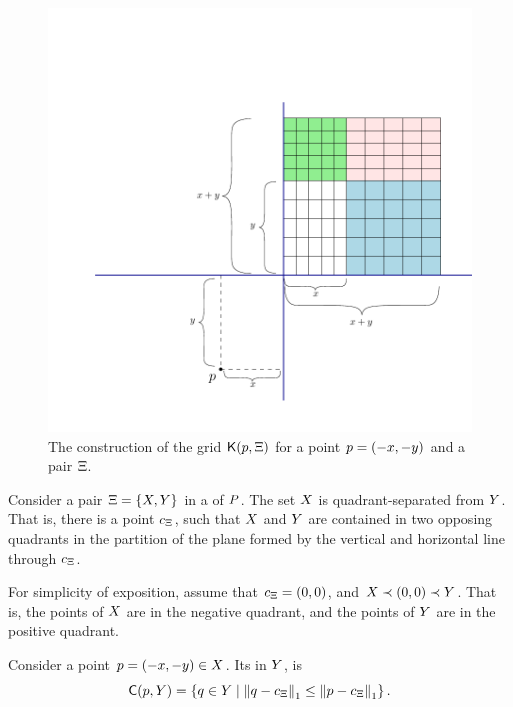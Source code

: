 \documentclass[12pt]{article}%
\begin{document}
\begin{figure}[t]
    \centering%
    \includegraphics{figs/grid_construction}%
    \caption{The construction of the grid $\mathsf{K}(p,\Xi)$ for a
       point $p=(-x,-y)$ and a pair $\Xi$.
   }
\end{figure}

Consider a pair $\Xi = \{X, Y \}$ in a \QSPD of $P$. The set
$X$ is quadrant-separated from $Y$. That is, there is a point
$c_\Xi$, such that $X$ and $Y$ are contained in two
opposing quadrants in the partition of the plane formed by the
vertical and horizontal line through $c_\Xi$.

For simplicity of exposition, assume that $c_\Xi = (0,0)$, and
$X \prec (0,0 ) \prec Y$. That is, the points of $X$ are in
the negative quadrant, and the points of $Y$ are in the positive
quadrant.

Consider a point $p = (-x,-y) \in X$. Its  in $Y$,
is
\begin{equation*}
    \clientsY{\pa}{\PSY}%
    =%
    \Set{ \pb \in \PSY }{ \dZ{1}{\pb}{\cen_\Pair}  \leq
       \dZ{1}{\pa}{\cen_\Pair}}.
\end{equation*}
\end{document}
